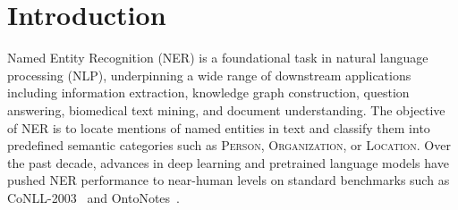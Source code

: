 \documentclass[14pt]{extreport}
\begin{document}
\clearpage
\thispagestyle{empty}




\clearpage
\thispagestyle{empty}

\clearpage	

\newpage
{}




\clearpage

\setcounter{tocdepth}{1}
\tableofcontents

\clearpage
{}
{}
\listoftables

\clearpage
{}
{}
\listoffigures
\clearpage	


\makeatletter
\setcounter{enumiv}{0}
\makeatother

\chapter{Introduction}\label{ch-Introduction}

Named Entity Recognition (NER) is a foundational task in natural language processing (NLP), underpinning a wide range of downstream applications including information extraction, knowledge graph construction, question answering, biomedical text mining, and document understanding. The objective of NER is to locate mentions of named entities in text and classify them into predefined semantic categories such as \textsc{Person}, \textsc{Organization}, or \textsc{Location}. Over the past decade, advances in deep learning and pretrained language models have pushed NER performance to near-human levels on standard benchmarks such as CoNLL-2003~\cite{tjong-kim-sang-de-meulder-2003-introduction} and OntoNotes~\cite{pradhan-etal-2013-towards}.
\end{document}

